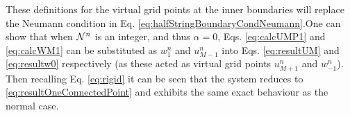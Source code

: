\SWcomment[***$\rightarrow$] These definitions for the virtual grid points at the inner boundaries will replace the Neumann condition in Eq. \eqref{eq:halfStringBoundaryCondNeumann}.\SWcomment[$\leftarrow$***] %
One can show that when $\mathcal{N}^n$ is an integer, and thus $\alpha = 0$, Eqs. \eqref{eq:calcUMP1} and \eqref{eq:calcWM1} can be substituted as $w_1^n$ and $u_{M-1}^n$ into Eqs. \eqref{eq:resultUM} and \eqref{eq:resultw0} respectively (as these acted as virtual grid points $u_{M+1}^n$ and $w_{-1}^n$). Then recalling Eq. \eqref{eq:rigid} it can be seen that the system reduces to \eqref{eq:resultOneConnectedPoint} and exhibits the same exact behaviour as the normal case. %

